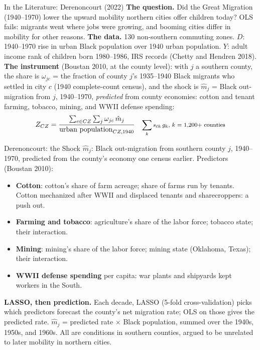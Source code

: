 \documentclass[aspectratio=169,11pt,xcolor=dvipsnames]{beamer}
\newcommand{\srcp}[1]{{\scriptsize\color{gray}(#1)}}
\begin{document}
\begin{frame}{In the Literature: Derenoncourt (2022)}
\textbf{The question.} Did the Great Migration (1940--1970) lower the upward
mobility northern cities offer children today? OLS fails: migrants went
where jobs were growing, and booming cities differ in mobility for other
reasons.
\vskip3pt
\textbf{The data.} 130 non-southern commuting zones. $D$: 1940--1970 rise
in urban Black population over 1940 urban population. $Y$: adult income rank
of children born 1980--1986, IRS records \srcp{Chetty and Hendren 2018}.
\vskip3pt
\textbf{The instrument} \srcp{Boustan 2010, at the county level}: with $j$ a
southern county, the share is $\omega_{jc}$ = the fraction of county $j$'s
1935--1940 Black migrants who settled in city $c$ (1940 complete-count
census), and the shock is $\hat m_j$ = Black out-migration from $j$,
1940--1970, \emph{predicted} from county economies: cotton and tenant
farming, tobacco, mining, and WWII defense spending:
\begin{align*}
  Z_{CZ} = \frac{\sum_{c \in CZ}\sum_{j}\omega_{jc}\,\hat m_j}
                {\text{urban population}_{CZ,1940}}
  && \text{\footnotesize $\sum_k s_{\ell k}\,g_k$, $k$ = 1{,}200+ counties}
\end{align*}
\end{frame}

\begin{frame}{Derenoncourt: the Shock}
$\hat m_j$: Black out-migration from southern county $j$, 1940--1970,
predicted from the county's economy one census earlier. Predictors \srcp{Boustan 2010}:
\begin{itemize}\itemsep0pt
  \item \textbf{Cotton}: cotton's share of farm acreage; share of farms run by
        tenants. Cotton mechanized after WWII and displaced tenants and
        sharecroppers: a push out.
  \item \textbf{Farming and tobacco}: agriculture's share of the labor force;
        tobacco state; their interaction.
  \item \textbf{Mining}: mining's share of the labor force; mining state
        (Oklahoma, Texas); their interaction.
  \item \textbf{WWII defense spending} per capita: war plants and shipyards
        kept workers in the South.
\end{itemize}
\textbf{LASSO, then prediction.} Each decade, LASSO (5-fold cross-validation)
picks which predictors forecast the county's net migration rate; OLS on those
gives the predicted rate. $\hat m_j$ = predicted rate $\times$ Black
population, summed over the 1940s, 1950s, and 1960s. All are conditions in southern counties, argued to be unrelated to later
mobility in northern cities.
\end{frame}
\end{document}
